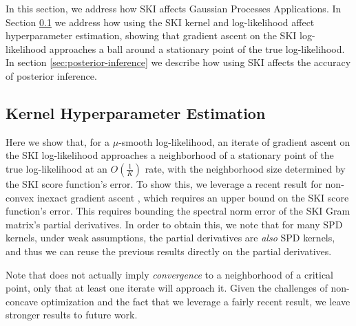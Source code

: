 In this section, we address how SKI affects Gaussian Processes Applications. In Section \ref{sec:kernel-hyperparameter-estimation} we address how using the SKI kernel and log-likelihood affect hyperparameter estimation, showing that gradient ascent on the SKI log-likelihood approaches a ball around a stationary point of the true log-likelihood. In section \ref{sec:posterior-inference} we describe how using SKI affects the accuracy of posterior inference.

\subsection{Kernel Hyperparameter Estimation}\label{sec:kernel-hyperparameter-estimation}

Here we show that, for a $\mu$-smooth log-likelihood, an iterate of gradient ascent on the SKI log-likelihood approaches a neighborhood of a stationary point of the true log-likelihood at an $O\left(\frac{1}{K}\right)$ rate, with the neighborhood size determined by the SKI score function's error. To show this, we leverage a recent result for non-convex inexact gradient ascent \cite{stonyakin2023stopping}, which requires an upper bound on the SKI score function's error. This requires bounding the spectral norm error of the SKI Gram matrix's partial derivatives. In order to obtain this, we note that for many SPD kernels, under weak assumptions, the partial derivatives are \textit{also} SPD kernels, and thus we can reuse the previous results directly on the partial derivatives.

Note that \cite{stonyakin2023stopping} does not actually imply \textit{convergence} to a neighborhood of a critical point, only that at least one iterate will approach it. Given the challenges of non-concave optimization and the fact that we leverage a fairly recent result, we leave stronger results to future work.


